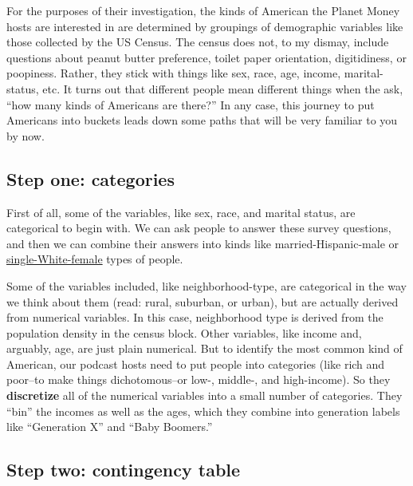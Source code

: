 \documentclass[
  openany]{book}
\begin{document}
For the purposes of their investigation, the kinds of American the Planet Money hosts are interested in are determined by groupings of demographic variables like those collected by the US Census. The census does not, to my dismay, include questions about peanut butter preference, toilet paper orientation, digitidiness, or poopiness. Rather, they stick with things like sex, race, age, income, marital-status, etc. It turns out that different people mean different things when the ask, ``how many kinds of Americans are there?'' In any case, this journey to put Americans into buckets leads down some paths that will be very familiar to you by now.

\hypertarget{step-one-categories}{%
\subsection*{Step one: categories}\label{step-one-categories}}

First of all, some of the variables, like sex, race, and marital status, are categorical to begin with. We can ask people to answer these survey questions, and then we can combine their answers into kinds like married-Hispanic-male or \href{https://www.imdb.com/title/tt0105414/}{single-White-female} types of people.

Some of the variables included, like neighborhood-type, are categorical in the way we think about them (read: rural, suburban, or urban), but are actually derived from numerical variables. In this case, neighborhood type is derived from the population density in the census block. Other variables, like income and, arguably, age, are just plain numerical. But to identify the most common kind of American, our podcast hosts need to put people into categories (like rich and poor--to make things dichotomous--or low-, middle-, and high-income). So they \textbf{discretize} all of the numerical variables into a small number of categories. They ``bin'' the incomes as well as the ages, which they combine into generation labels like ``Generation X'' and ``Baby Boomers.''

\hypertarget{step-two-contingency-table}{%
\subsection*{Step two: contingency table}\label{step-two-contingency-table}}
\end{document}

